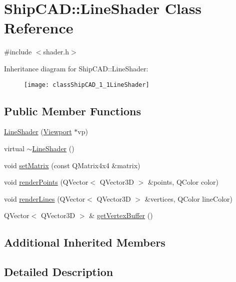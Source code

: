 \hypertarget{classShipCAD_1_1LineShader}{}\section{Ship\+C\+AD\+:\+:Line\+Shader Class Reference}
\label{classShipCAD_1_1LineShader}


{\ttfamily \#include $<$shader.\+h$>$}

Inheritance diagram for Ship\+C\+AD\+:\+:Line\+Shader\+:\begin{figure}[H]
\begin{center}
\leavevmode
\texttt{[image: classShipCAD\_1\_1LineShader]}
\end{center}
\end{figure}
\subsection*{Public Member Functions}
\begin{DoxyCompactItemize}
\item 
\hyperlink{classShipCAD_1_1LineShader_ae06ecf68dfc054511db3937893850d2f}{Line\+Shader} (\hyperlink{classShipCAD_1_1Viewport}{Viewport} $\ast$vp)
\item 
virtual \hyperlink{classShipCAD_1_1LineShader_ae5c2761813aac4839a5b31648e37d343}{$\sim$\+Line\+Shader} ()
\item 
void \hyperlink{classShipCAD_1_1LineShader_ac0ee7d9d9f4fa7e4d233c2426c756a68}{set\+Matrix} (const Q\+Matrix4x4 \&matrix)
\item 
void \hyperlink{classShipCAD_1_1LineShader_aaa105117e559ec413a733e14dc638b5a}{render\+Points} (Q\+Vector$<$ Q\+Vector3D $>$ \&points, Q\+Color color)
\item 
void \hyperlink{classShipCAD_1_1LineShader_a3d30bda1883e0eda65ea23c4da76f610}{render\+Lines} (Q\+Vector$<$ Q\+Vector3D $>$ \&vertices, Q\+Color line\+Color)
\item 
Q\+Vector$<$ Q\+Vector3D $>$ \& \hyperlink{classShipCAD_1_1LineShader_a68f7433ac957df5b454eb1440ad1c7d9}{get\+Vertex\+Buffer} ()
\end{DoxyCompactItemize}
\subsection*{Additional Inherited Members}


\subsection{Detailed Description}


